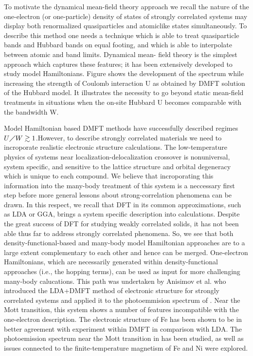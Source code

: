 \documentclass[12 pt]{article}
\begin{document}
{  To motivate the dynamical mean-field theory approach we recall the nature of the one-electron (or one-particle) density 
of states of strongly correlated systems may display both renormalized quasiparticles and atomiclike states 
simultaneously. To describe this method one needs a technique which is able to treat quasiparticle bands and 
Hubbard bands on equal footing, and which is able to interpolate between atomic and band limits. Dynamical mean-
field theory is the simplest approach which captures these features; it has been extensively developed to study 
model Hamiltonians. Figure shows the development of the spectrum while increasing the strength of Coulomb interaction 
U as obtained by DMFT solution of the Hubbard model. It illustrates the necessity to go beyond static mean-field 
treatments in situations when the on-site Hubbard U becomes comparable with the bandwidth W. 

  Model Hamiltonian based DMFT methods have successfully described regimes $U\diagup W \gtrsim 1$.However, to describe
 strongly correlated materials we need to incroporate realistic electronic structure calculations. The low-temperature 
physics of systems near localization-delocalization crossover is nonuniversal, system specific, and sensitive to the 
lattice structure and orbital degeneracy which is unique to each compound. We believe that incroporating this 
information into the many-body treatment of this system is a neccessary first step before more general lessons about 
strong-correlation phenomena can be drawn. In this respect, we recall that DFT in its common approximations, such 
as LDA or GGA, brings a system specific description into calculations. Despite the great success of DFT for studying 
weakly correlated solids, it has not been able thus far to address strongly correlated phenomena. So, we see that 
both density-functional-based and many-body model Hamiltonian approaches are to a large extent complementary to 
each other and hence can be merged. One-electron Hamiltonians, which are necessarily generated within density-functional 
approaches (i.e., the hopping terms), can be used as input for more challenging many-body calucations. This path 
was undertaken by Anisimov et al. who introduced the LDA+DMFT method of electronic structure for strongly correlated 
systems and applied it to the photoemmision spectrum of . Near the Mott transition, this system shows a number of 
features incompatible with the one-electron description. The electronic structure of Fe has been shown to be in 
better agreement with experiment within DMFT in comparison with LDA. The photoemission spectrum near the Mott transition 
in has been studied, as well as issues connected to the finite-temperature magnetism of Fe and Ni were explored. 

}
\end{document}
